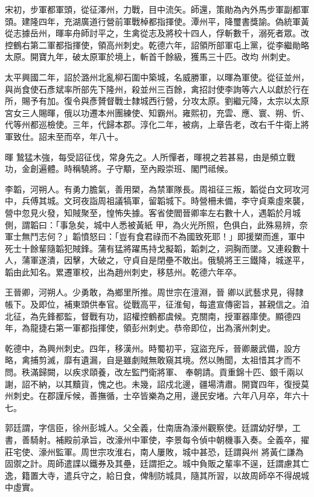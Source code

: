 \begin{pinyinscope}
 宋初，步軍都軍頭，從征澤州，力戰，目中流矢。師還，策勛為內外馬步軍副都軍頭。建隆四年，充湖廣道行營前軍戰棹都指揮使。潭州平，降璽書獎諭。偽統軍黃從志據岳州，暉率舟師討平之，生禽從志及將校十四人，俘斬數千，溺死者眾。改控鶴右第二軍都指揮使，領高州刺史。乾德六年，詔領所部軍屯上黨，從李繼勛略太原。開寶九年，破太原軍於境上，斬首千餘級，獲馬三十匹。改均
 州刺史。



 太平興國二年，詔於潞州北亂柳石圍中築城，名威勝軍，以暉為軍使。從征並州，與尚食使石彥斌率所部先下隆州，殺並州三百餘，禽招討使李詢等六人以獻於行在所，賜予有加。復令與彥贇督戰士隸城西行營，分攻太原。劉繼元降，太宗以太原宮女三人賜暉，俄以功遷本州團練使、知霸州。雍熙初，充雲、應、寰、朔、忻、代等州都巡檢使。三年，代歸本郡。淳化二年，被病，上章告老，改右千牛衛上將軍致仕。詔未至而卒，年八十。



 暉
 鷙猛木強，每受詔征伐，常身先之。人所憚者，暉視之若甚易，由是頻立戰功，金創遍體。時稱驍將。子守顒，至內殿崇班、閣門祗候。



 李韜，河朔人。有勇力膽氣，善用槊，為禁軍隊長。周祖征三叛，韜從白文珂攻河中，兵傅其城。文珂夜詣周祖議犒軍，留韜城下。時營柵未備，李守貞乘虛來襲，營中忽見火發，知賊聚至，惶怖失據。客省使閻晉卿率左右數十人，遇韜於月城側，謂韜曰：「事急矣，城中人悉被黃紙
 甲，為火光所照，色俱白，此殊易辨，奈軍士無鬥志何？」韜憤怒曰：「豈有食君祿而不為國致死耶！」即援槊而進，軍中死士十餘輩隨韜犯賊鋒。蒲有猛將躍馬持戈擬韜，韜刺之，洞胸而墜。又連殺數十人，蒲軍遂潰，因擊，大破之，守貞自是閉壘不敢出。俄驍將王三鐵降，城遂平，韜由此知名。累遷軍校，出為趙州刺史，移慈州。乾德六年卒。



 王晉卿，河朔人。少勇敢，為鄉里所推。周世宗在澶淵，晉
 卿以武藝求見，得隸帳下。及即位，補東頭供奉官。從戰高平，征淮甸，每遣宣傳密旨，甚親信之。洎北征，為先鋒都監，督戰有功，詔權控鶴都虞候。克關南，授軍器庫使。顯德四年，為龍捷右第一軍都指揮使，領彭州刺史。恭帝即位，出為濱州刺史。



 乾德中，為興州刺史。四年，移漢州。時蜀初平，寇盜充斥，晉卿嚴武備，設方略，禽捕剪滅，靡有遺漏，自是雖劇賊無敢窺其境。然以賄聞，太祖惜其才而不問。秩滿歸闕，以疾求頤養，改左監門衛將軍、
 奉朝請。貢重錦十匹、銀千兩以謝，詔不納，以其黷貨，愧之也。未幾，詔戍北邊，疆場清肅。開寶四年，復授莫州刺史。在郡謹斥候，善撫循，士卒皆樂為之用，邊民安堵。六年八月卒，年六十七。



 郭廷謂，字信臣，徐州彭城人。父全義，仕南唐為濠州觀察使。廷謂幼好學，工書，善騎射。補殿前承旨，改濠州中軍使，李景每令偵中朝機事入奏。全義卒，擢莊宅使、濠州監軍。周世宗攻淮右，南人屢敗，城中甚恐，廷謂與州
 將黃仁謙為固禦之計。周師遣諜以鐵券及其壘，廷謂拒之。城中負販之輩率不逞，廷謂慮其亡逸，籍置大寺，遣兵守之，給日食，俾制防城具，隨其所習，以故周師卒不得覘城中虛實。




\end{pinyinscope}
